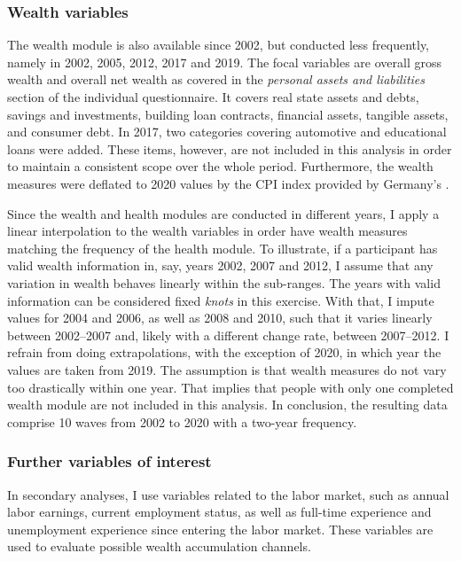 \subsubsection{Wealth variables}

The wealth module is also available since 2002, but conducted less frequently, namely in 2002, 2005, 2012, 2017 and
2019. %
The focal variables are overall gross wealth and overall net wealth as covered in the \textit{personal assets and
    liabilities} section of the individual questionnaire. It covers real state assets and debts, savings and
investments, building loan contracts, financial assets, tangible assets, and consumer debt. In 2017, two categories
covering automotive and educational loans were added. These items, however, are not included in this analysis in
order to maintain a consistent scope over the whole period. Furthermore, the wealth measures were deflated to 2020
values by the CPI index provided by Germany's \textcite{destatiscpi}. 


Since the wealth and health modules are conducted in different years, I apply a linear interpolation to the wealth
variables in order have wealth measures matching the frequency of the health module. To illustrate, if a
participant has valid wealth information in, say, years 2002, 2007 and 2012, I assume that any variation in
wealth behaves linearly within the sub-ranges. The years with valid information can be considered fixed
\textit{knots} in this exercise. With that, I impute values for 2004 and 2006, as well as 2008 and 2010, such that
it varies linearly between 2002--2007 and, likely with a different change rate, between 2007--2012. I refrain
from doing extrapolations, with the exception of 2020, in which year the values are taken from 2019.  The
assumption is that wealth measures do not vary too drastically within one year. That implies that people with
only one completed wealth module are not included in this analysis. In conclusion, the resulting data comprise
10 waves from 2002 to 2020 with a two-year frequency.

\subsubsection{Further variables of interest} In secondary analyses, I use variables related to the labor market,
such as annual labor earnings, current employment status, as well as full-time experience and unemployment
experience since entering the labor market. These variables are used to evaluate possible wealth accumulation
channels.

